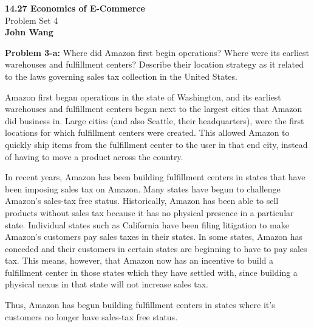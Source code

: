 \documentclass[psamsfonts]{amsart}
\newenvironment{sol}{\vspace{0.25cm}{\large \bfseries Solution:}}{\qedsymbol}
\newenvironment{prob}[1]{\begin{framed}{\large \bfseries Problem #1:}}{\end{framed}}
\newcommand{\makenewtitle}{
    \begin{center}
    {\huge \bfseries 14.27 Economics of E-Commerce} \\
    Problem Set 4\\
    \vspace{0.25cm}
    {\bfseries John Wang} 
    \end{center}
    \vspace{0.5cm}
}
\begin{document}
\makenewtitle
\begin{prob}{3-a}
Where did Amazon first begin operations? Where were its earliest warehouses and fulfillment centers? Describe their location strategy as it related to the laws governing sales tax collection in the United States.
\end{prob}
\begin{sol}
Amazon first began operations in the state of Washington, and its earliest warehouses and fulfillment centers began next to the largest cities that Amazon did business in. Large cities (and also Seattle, their headquarters), were the first locations for which fulfillment centers were created. This allowed Amazon to quickly ship items from the fulfillment center to the user in that end city, instead of having to move a product across the country. 

In recent years, Amazon has been building fulfillment centers in states that have been imposing sales tax on Amazon. Many states have begun to challenge Amazon's sales-tax free status. Historically, Amazon has been able to sell products without sales tax because it has no physical presence in a particular state. Individual states such as California have been filing litigation to make Amazon's customers pay sales taxes in their states. In some states, Amazon has conceded and their customers in certain states are beginning to have to pay sales tax. This means, however, that Amazon now has an incentive to build a fulfillment center in those states which they have settled with, since building a physical nexus in that state will not increase sales tax. 

Thus, Amazon has begun building fulfillment centers in states where it's customers no longer have sales-tax free status.
\end{sol}
\end{document}
